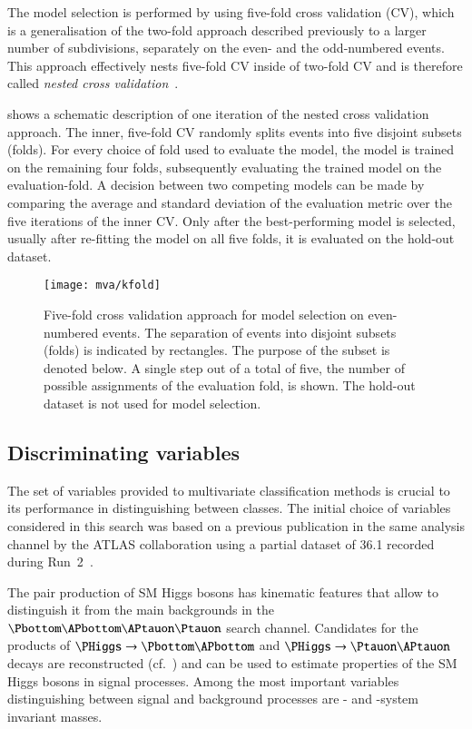 The model selection is performed by using five-fold cross validation
(CV), which is a generalisation of the two-fold approach described
previously to a larger number of subdivisions, separately on the even-
and the odd-numbered events. This approach effectively nests five-fold
CV inside of two-fold CV and is therefore called \emph{nested cross
  validation}~\cite{cawley10,stone74}.

 shows a schematic description of one
iteration of the nested cross validation approach. The inner,
five-fold CV randomly splits events into five disjoint subsets
(folds). For every choice of fold used to evaluate the model, the
model is trained on the remaining four folds, subsequently evaluating
the trained model on the evaluation-fold. A decision between two
competing models can be made by comparing the average and standard
deviation of the evaluation metric over the five iterations of the
inner CV. Only after the best-performing model is selected, usually
after re-fitting the model on all five folds, it is evaluated on the
hold-out dataset.

\begin{figure}[htbp]
  \centering

  \texttt{[image: mva/kfold]}

  \caption{Five-fold cross validation approach for model selection on
    even-numbered events. The separation of events into disjoint
    subsets (folds) is indicated by rectangles. The purpose of the
    subset is denoted below. A single step out of a total of five, the
    number of possible assignments of the evaluation fold, is
    shown. The hold-out dataset is not used for model selection.}
  \label{fig:cross_validation}
\end{figure}


\subsection{Discriminating variables}
\label{sec:mva_discriminating variables}

The set of variables provided to multivariate classification methods
is crucial to its performance in distinguishing between classes. The
initial choice of variables considered in this search was based on a
previous publication in the same analysis channel by the ATLAS
collaboration using a partial dataset of \SI{36.1}{\ifb} recorded
during Run~2~\cite{HIGG-2016-16-witherratum}.

The pair production of SM Higgs bosons has kinematic features that
allow to distinguish it from the main backgrounds in the $\bbtautau$
search channel. Candidates for the products of
$\PHiggs \ra \Pbottom\APbottom$ and $\PHiggs \ra \Ptauon\APtauon$
decays are reconstructed (cf.~) and can be used to estimate
properties of the SM Higgs bosons in signal processes. Among the most
important variables distinguishing between signal and background
processes are \PHiggs- and \HH-system invariant masses.

